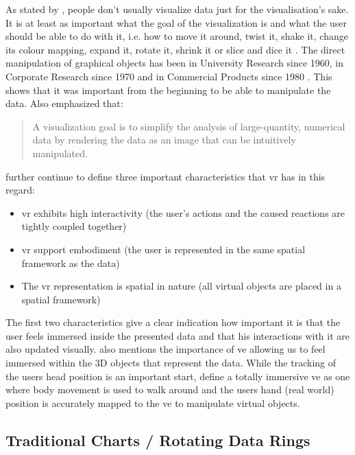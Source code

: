 As stated by \cite{Stone1994}, people don't usually visualize data just for the visualisation's sake. It is at least as important what the goal of the visualization is and what the user should be able to do with it, i.e. how to move it around, twist it, shake it, change its colour mapping, expand it, rotate it, shrink it or slice and dice it \citep{Stone1994}. The direct manipulation of graphical objects has been in University Research since 1960, in Corporate Research since 1970 and in Commercial Products since 1980 \citep{Myers1998}. This shows that it was important from the beginning to be able to manipulate the data. Also \citet[p.410]{Stone1994} emphasized that: \blockquote{A visualization goal is to simplify the analysis of large-quantity, numerical data by rendering the data as an image that can be intuitively manipulated.} \cite{Stone1994} further continue to define three important characteristics that \gls{vr} has in this regard:
\begin{itemize}[noitemsep,nolistsep]
	\item \gls{vr} exhibits high interactivity (the user's actions and the caused reactions are tightly coupled together)
	\item \gls{vr} support embodiment (the user is represented  in the same spatial framework as the data)
	\item The \gls{vr} representation is spatial in nature (all virtual objects are placed in a spatial framework)
\end{itemize}
The first two characteristics give a clear indication how important it is that the user feels immersed inside the presented data and that his interactions with it are also updated visually. \cite{Jamieson2007} also mentions the importance of \gls{ve} allowing us to feel immersed within the 3D objects that represent the data. While the tracking of the users head position is an important start, \cite{Jamieson2007} define a totally immersive \gls{ve} as one where body movement is used to walk around and the users hand (real world) position is accurately mapped to the \gls{ve} to manipulate virtual objects.



\subsection{Traditional Charts / Rotating Data Rings}

